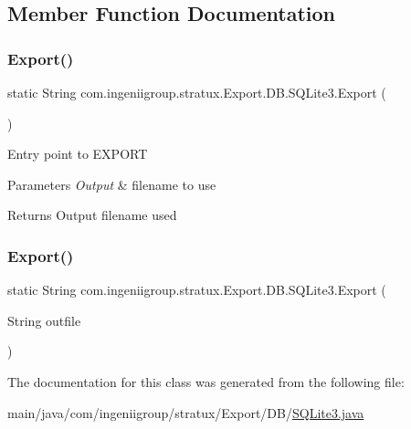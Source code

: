\subsection{Member Function Documentation}
\mbox{\label{classcom_1_1ingeniigroup_1_1stratux_1_1_export_1_1_d_b_1_1_s_q_lite3_a2c4c68f5c2e4970de5d4010f1667949b}} 
\subsubsection{\texorpdfstring{Export()}{Export()}\hspace{0.1cm}{\footnotesize\ttfamily [1/2]}}
{\footnotesize\ttfamily static String com.\+ingeniigroup.\+stratux.\+Export.\+D\+B.\+S\+Q\+Lite3.\+Export (\begin{DoxyParamCaption}{ }\end{DoxyParamCaption})\hspace{0.3cm}{\ttfamily [static]}}

Entry point to E\+X\+P\+O\+RT


\begin{DoxyParams}{Parameters}
{\em Output} & filename to use\\
\hline
\end{DoxyParams}
\begin{DoxyReturn}{Returns}
Output filename used 
\end{DoxyReturn}
\mbox{\label{classcom_1_1ingeniigroup_1_1stratux_1_1_export_1_1_d_b_1_1_s_q_lite3_a768ac50ab39c72574deba1649aca3d35}} 
\subsubsection{\texorpdfstring{Export()}{Export()}\hspace{0.1cm}{\footnotesize\ttfamily [2/2]}}
{\footnotesize\ttfamily static String com.\+ingeniigroup.\+stratux.\+Export.\+D\+B.\+S\+Q\+Lite3.\+Export (\begin{DoxyParamCaption}\item[{String}]{outfile }\end{DoxyParamCaption})\hspace{0.3cm}{\ttfamily [static]}}



The documentation for this class was generated from the following file\+:\begin{DoxyCompactItemize}
\item 
main/java/com/ingeniigroup/stratux/\+Export/\+D\+B/\hyperlink{_s_q_lite3_8java}{S\+Q\+Lite3.\+java}\end{DoxyCompactItemize}
